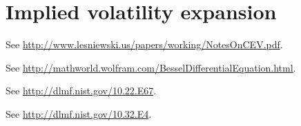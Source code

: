 \documentclass[12pt]{article}
\begin{document}
\section{Implied volatility expansion}



\begin{thebibliography}{99}
    See \url{http://www.lesniewski.us/papers/working/NotesOnCEV.pdf}.

    See \url{http://mathworld.wolfram.com/BesselDifferentialEquation.html}.

    See \url{http://dlmf.nist.gov/10.22.E67}.

    See \url{http://dlmf.nist.gov/10.32.E4}.
\end{thebibliography}
\end{document}

